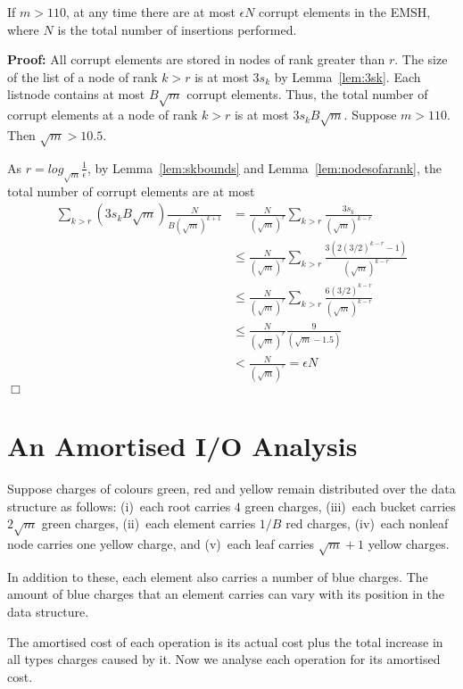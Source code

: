 \begin{lemma}
If $m>110$, at any time there are at most $\epsilon N$ corrupt elements in the EMSH,
where $N$ is the total number of insertions performed.
\end{lemma}
{\bf Proof:}
All corrupt elements are stored in nodes of rank greater than $r$.
The size of the list of a node of rank $k>r$ is
    at most $3s_k$ by Lemma~\ref{lem:3sk}.
Each listnode contains at most $B\sqrt{m}$ corrupt elements.
Thus, the total number of corrupt elements at a node of rank $k>r$
	is at most $3s_kB\sqrt{m}$.
Suppose $m>110$. Then $\sqrt{m}>10.5$.

As $r = log_{\sqrt{m}}\frac{1}{\epsilon}$, 
by Lemma~\ref{lem:skbounds} and Lemma~\ref{lem:nodesofarank},
the total number of
corrupt elements are at most
\begin{equation*}
\begin{split}
\sum_{k>r}(3s_kB\sqrt{m})\frac{N}{B(\sqrt{m})^{k+1}} & =
\frac{N}{(\sqrt{m})^r}  \sum_{k>r}\frac{3  s_k}{(\sqrt{m})^{k-r}} \\
 & \leq \frac{N}{(\sqrt{m})^r} \sum_{k>r}\frac{3  (2  (3/2)^{k-r} - 1)}{(\sqrt{m})^{k-r}} \\
 & \leq \frac{N}{(\sqrt{m})^r} \sum_{k>r}\frac{6 
 (3/2)^{k-r}}{(\sqrt{m})^{k-r}} \\
 & \leq \frac{N}{(\sqrt{m})^r}  \frac{9}{(\sqrt{m}- 1.5)}\\
 & < \frac{N}{(\sqrt{m})^r} = \epsilon N
\end{split}
\end{equation*}
\hfill $\Box$


\section{An Amortised I/O Analysis}
\label{analy:emsh}

Suppose charges of colours green, red and yellow remain distributed over the
data structure as follows: (i)~each root carries $4$  green charges,
(iii)~each bucket carries $2\sqrt{m}$ green charges,
(ii)~each element carries $1/B$ red charges,
(iv)~each nonleaf node carries one yellow charge, and
(v)~each leaf carries $\sqrt{m}+1$ yellow charges.

In addition to these, each element also carries a number of blue charges.
The amount of blue charges that an element carries can vary with its position
in the data structure.

The amortised cost of each operation is its actual cost plus
the total increase in all types charges caused by it.
Now we analyse each operation for its amortised cost.

